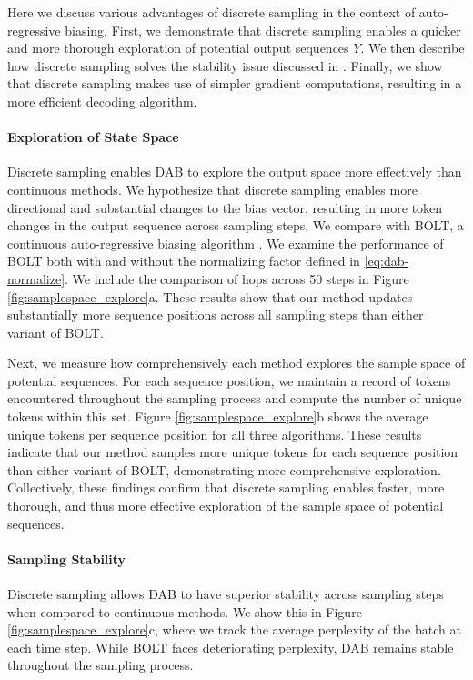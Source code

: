 Here we discuss various advantages of discrete sampling in the context of auto-regressive biasing. First, we demonstrate that discrete sampling enables a quicker and more thorough exploration of potential output sequences $Y$. We then describe how discrete sampling solves the stability issue discussed in \citet{liu2023bolt}. Finally, we show that discrete sampling makes use of simpler gradient computations, resulting in a more efficient decoding algorithm.

\paragraph{Exploration of State Space}
Discrete sampling enables DAB to explore the output space more effectively than continuous methods.
We hypothesize that discrete sampling enables more directional and substantial changes to the bias vector, resulting in more token changes in the output sequence across sampling steps. 
We compare with BOLT, a continuous auto-regressive biasing algorithm \citep{liu2023bolt}. 
We examine the performance of BOLT both with and without the normalizing factor defined in \eqref{eq:dab-normalize}. 
We include the comparison of hops across 50 steps in Figure \ref{fig:samplespace_explore}a.
These results show that our method updates substantially more sequence positions across all sampling steps than either variant of BOLT. 

Next, we measure how comprehensively each method explores the sample space of potential sequences. 
For each sequence position, we maintain a record of tokens encountered throughout the sampling process and compute the number of unique tokens within this set. 
Figure \ref{fig:samplespace_explore}b shows the average unique tokens per sequence position for all three algorithms. 
These results indicate that our method samples more unique tokens for each sequence position than either variant of BOLT, demonstrating more comprehensive exploration. 
Collectively, these findings confirm that discrete sampling enables faster, more thorough, and thus more effective exploration of the sample space of potential sequences. 
\paragraph{Sampling Stability}
Discrete sampling allows DAB to have superior stability across sampling steps when compared to continuous methods. 
We show this in Figure \ref{fig:samplespace_explore}c, where we track the average perplexity of the batch at each time step. 
While BOLT faces deteriorating perplexity, DAB remains stable throughout the sampling process. 

